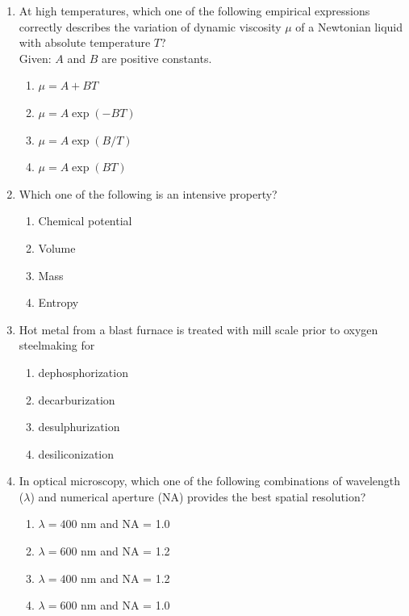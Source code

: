 \documentclass[journal]{IEEEtran}
\theoremstyle{remark}
\begin{document}
\begin{enumerate}[resume]
\item At high temperatures, which one of the following empirical expressions correctly describes the variation of dynamic viscosity $\mu$ of a Newtonian liquid with absolute temperature $T$? \hfill{} \\
Given: $A$ and $B$ are positive constants.
\begin{multicols}{2}
\begin{enumerate}
\item $\mu = A + BT$
\item $\mu = A \exp(-BT)$
\item $\mu = A \exp(B/T)$ 
\item $\mu = A \exp(BT)$
\end{enumerate}
\end{multicols}

\item Which one of the following is an intensive property? \hfill{}
\begin{multicols}{2}
\begin{enumerate}
\item Chemical potential
\item Volume
\item Mass
\item Entropy
\end{enumerate}
\end{multicols}

\item Hot metal from a blast furnace is treated with mill scale prior to oxygen steelmaking for \underline{\hspace{2cm}} \hfill{}
\begin{multicols}{2}
\begin{enumerate}
\item dephosphorization
\item decarburization
\item desulphurization
\item desiliconization
\end{enumerate}
\end{multicols}

\item In optical microscopy, which one of the following combinations of wavelength ($\lambda$) and numerical aperture (NA) provides the best spatial resolution? \hfill{}
\begin{multicols}{2}
\begin{enumerate}
\item $\lambda = 400$ nm and NA = 1.0
\item $\lambda = 600$ nm and NA = 1.2
\item $\lambda = 400$ nm and NA = 1.2
\item $\lambda = 600$ nm and NA = 1.0
\end{enumerate}
\end{multicols}


\end{enumerate}
\end{document}
